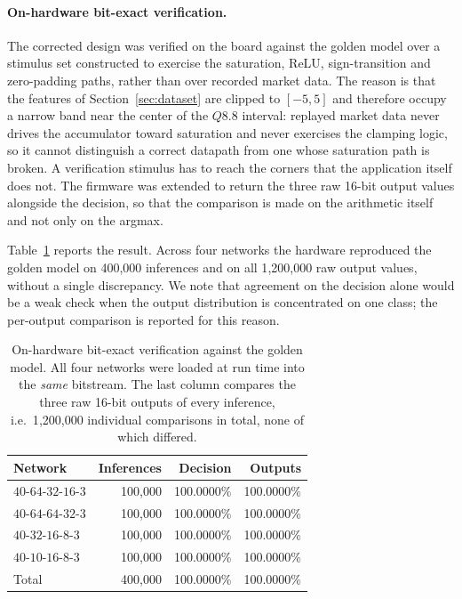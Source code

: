 \documentclass[final,5p,times,twocolumn]{elsarticle}
\begin{document}
\paragraph{On-hardware bit-exact verification.}
The corrected design was verified on the board against the golden model over a
stimulus set constructed to exercise the saturation, ReLU, sign-transition and
zero-padding paths, rather than over recorded market data. The reason is that
the features of Section~\ref{sec:dataset} are clipped to $[-5, 5]$ and therefore
occupy a narrow band near the center of the $Q8.8$ interval: replayed market
data never drives the accumulator toward saturation and never exercises the
clamping logic, so it cannot distinguish a correct datapath from one whose
saturation path is broken. A verification stimulus has to reach the corners that
the application itself does not. The firmware was extended to return the three
raw 16-bit output values alongside the decision, so that the comparison is
made on the arithmetic itself and not only on the argmax.

Table~\ref{tab:verification} reports the result. Across four networks the
hardware reproduced the golden model on 400{,}000 inferences and on all
1{,}200{,}000 raw output values, without a single discrepancy. We note that
agreement on the decision alone would be a weak check when the output
distribution is concentrated on one class; the per-output comparison is reported
for this reason.

\begin{table}[htbp]
\centering
\caption{On-hardware bit-exact verification against the golden model. All four
networks were loaded at run time into the \emph{same} bitstream. The last column
compares the three raw 16-bit outputs of every inference, i.e.\ 1{,}200{,}000
individual comparisons in total, none of which differed.}
\label{tab:verification}
\small
\begin{tabular}{@{}lrrr@{}}
\toprule
Network & Inferences & Decision & Outputs \\
\midrule
$40$-$64$-$32$-$16$-$3$ & 100{,}000 & 100.0000\% & 100.0000\% \\
$40$-$64$-$64$-$32$-$3$ & 100{,}000 & 100.0000\% & 100.0000\% \\
$40$-$32$-$16$-$8$-$3$  & 100{,}000 & 100.0000\% & 100.0000\% \\
$40$-$10$-$16$-$8$-$3$  & 100{,}000 & 100.0000\% & 100.0000\% \\
\midrule
Total                   & 400{,}000 & 100.0000\% & 100.0000\% \\
\bottomrule
\end{tabular}
\end{table}
\end{document}
